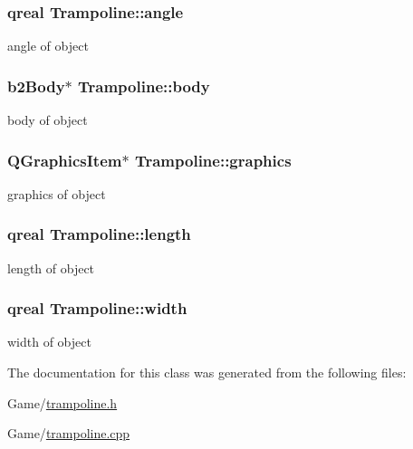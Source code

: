 \subsubsection[{\texorpdfstring{angle}{angle}}]{\setlength{\rightskip}{0pt plus 5cm}qreal Trampoline\+::angle}\hypertarget{class_trampoline_ae2b2f0ba18c591bbcf360f368758edf7}{}\label{class_trampoline_ae2b2f0ba18c591bbcf360f368758edf7}


angle of object 

\subsubsection[{\texorpdfstring{body}{body}}]{\setlength{\rightskip}{0pt plus 5cm}b2\+Body$\ast$ Trampoline\+::body}\hypertarget{class_trampoline_a5640097c2fa1b82b69338e3e3d5fc18e}{}\label{class_trampoline_a5640097c2fa1b82b69338e3e3d5fc18e}


body of object 

\subsubsection[{\texorpdfstring{graphics}{graphics}}]{\setlength{\rightskip}{0pt plus 5cm}Q\+Graphics\+Item$\ast$ Trampoline\+::graphics}\hypertarget{class_trampoline_a889e4c0143c14b47dc7575395356560a}{}\label{class_trampoline_a889e4c0143c14b47dc7575395356560a}


graphics of object 

\subsubsection[{\texorpdfstring{length}{length}}]{\setlength{\rightskip}{0pt plus 5cm}qreal Trampoline\+::length}\hypertarget{class_trampoline_afc20b8e85af09d551c0278b2dcc1d35d}{}\label{class_trampoline_afc20b8e85af09d551c0278b2dcc1d35d}


length of object 

\subsubsection[{\texorpdfstring{width}{width}}]{\setlength{\rightskip}{0pt plus 5cm}qreal Trampoline\+::width}\hypertarget{class_trampoline_abc6d02536d9caeb1c1d80c545ebae044}{}\label{class_trampoline_abc6d02536d9caeb1c1d80c545ebae044}


width of object 



The documentation for this class was generated from the following files\+:\begin{DoxyCompactItemize}
\item 
Game/\hyperlink{trampoline_8h}{trampoline.\+h}\item 
Game/\hyperlink{trampoline_8cpp}{trampoline.\+cpp}\end{DoxyCompactItemize}
